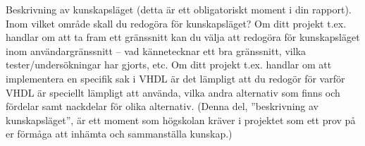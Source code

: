 Beskrivning av kunskapsläget (detta är ett obligatoriskt moment i din rapport). Inom vilket område skall du redogöra för kunskapsläget? Om ditt projekt t.ex. handlar om att ta fram ett gränssnitt kan du välja att redogöra för kunskapsläget inom användargränssnitt – vad kännetecknar ett bra gränssnitt, vilka tester/undersökningar har gjorts, etc. Om ditt projekt t.ex. handlar om att implementera en specifik sak i VHDL är det lämpligt att du redogör för varför VHDL är speciellt lämpligt att använda, vilka andra alternativ som finns och fördelar samt nackdelar för olika alternativ. (Denna del, ”beskrivning av kunskapsläget”, är ett moment som högskolan kräver i projektet som ett prov på er förmåga att inhämta och sammanställa kunskap.)